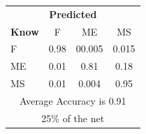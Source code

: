 \documentclass[12pt]{article} %
\begin{document}
\begin{minipage}{0.5\textwidth}
\begin{center}
\begin{tabular}{l|c|c|c|}
 \multicolumn{4}{c}{ \textbf{ Predicted}}\\
 \textbf{Know}&F&ME&MS\\ \hline\hline
F   &0.98&00.005&0.015\\
ME &0.01&0.81&0.18\\
MS &0.01&0.004&0.95\\
\multicolumn{4}{c}{Average Accuracy is 0.91}\\
\multicolumn{4}{c}{25\%  of the net}\\
\end{tabular}
\end{center}
\end{minipage}
\end{document}
